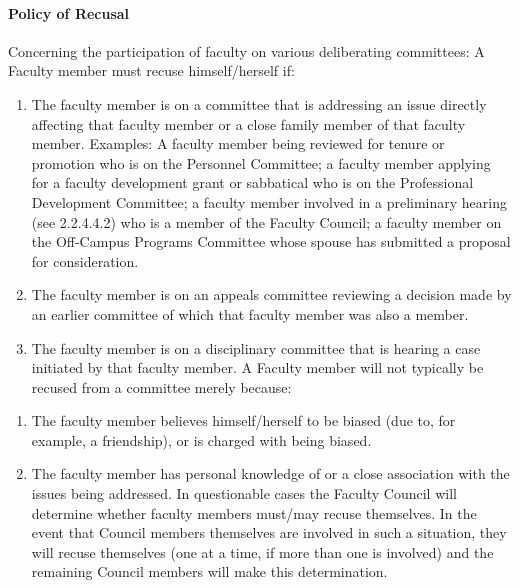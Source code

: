 \documentclass[letterpaper, 11pt]{article}
\begin{document}
			\paragraph{Policy of Recusal}
				Concerning the participation of faculty on various deliberating committees:  A Faculty member must recuse himself/herself if:
				\begin{enumerate}[label=\alph*)]
					\item{The faculty member is on a committee that is addressing an issue directly affecting that faculty member or a close family member of that faculty member.  Examples: A faculty member being reviewed for tenure or promotion who is on the Personnel Committee; a faculty member applying for a faculty development grant or sabbatical who is on the Professional Development Committee; a faculty member involved in a preliminary hearing (see 2.2.4.4.2) who is a member of the Faculty Council; a faculty member on the Off-Campus Programs Committee whose spouse has submitted a proposal for consideration.}
					\item{The faculty member is on an appeals committee reviewing a decision made by an earlier committee of which that faculty member was also a member.}
					\item{The faculty member is on a disciplinary committee that is hearing a case initiated by that faculty member.}
					A Faculty member will not typically be recused from a committee merely because:
				\end{enumerate}
				\begin{enumerate}[label=\alph*)]
					\item{The faculty member believes himself/herself to be biased (due to, for example, a  friendship), or is charged with being biased.}
					\item{The faculty member has personal knowledge of or a close association with the issues being addressed.}
					In questionable cases the Faculty Council will determine whether faculty members must/may recuse themselves.  In the event that Council members themselves are involved in such a situation, they will recuse themselves (one at a time, if more than one is involved) and the remaining Council members will make this determination.
				\end{enumerate}
\end{document}
